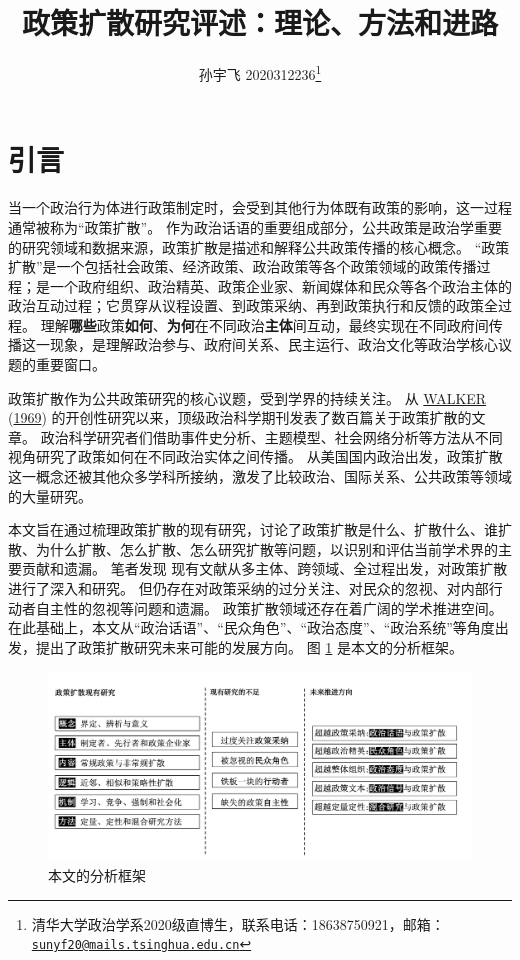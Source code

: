 \documentclass[
  12pt,
]{ctexart}
\title{政策扩散研究评述：理论、方法和进路}
\author{孙宇飞 2020312236\footnote{清华大学政治学系2020级直博生，联系电话：18638750921，邮箱：\href{mailto:sunyf20@mails.tsinghua.edu.cn}{\nolinkurl{sunyf20@mails.tsinghua.edu.cn}}}}
\date{}
\begin{document}
\maketitle

{
\hypersetup{linkcolor=}
\setcounter{tocdepth}{2}
\tableofcontents
}
\newpage

\hypertarget{ux5f15ux8a00}{%
\section{引言}\label{ux5f15ux8a00}}

当一个政治行为体进行政策制定时，会受到其他行为体既有政策的影响，这一过程通常被称为``政策扩散''。
作为政治话语的重要组成部分，公共政策是政治学重要的研究领域和数据来源，政策扩散是描述和解释公共政策传播的核心概念。
``政策扩散''是一个包括社会政策、经济政策、政治政策等各个政策领域的政策传播过程；是一个政府组织、政治精英、政策企业家、新闻媒体和民众等各个政治主体的政治互动过程；它贯穿从议程设置、到政策采纳、再到政策执行和反馈的政策全过程。
理解\textbf{哪些}政策\textbf{如何}、\textbf{为何}在不同政治\textbf{主体}间互动，最终实现在不同政府间传播这一现象，是理解政治参与、政府间关系、民主运行、政治文化等政治学核心议题的重要窗口。

政策扩散作为公共政策研究的核心议题，受到学界的持续关注。
从 \protect\hyperlink{ref-Walker1969}{WALKER} (\protect\hyperlink{ref-Walker1969}{1969}) 的开创性研究以来，顶级政治科学期刊发表了数百篇关于政策扩散的文章。
政治科学研究者们借助事件史分析、主题模型、社会网络分析等方法从不同视角研究了政策如何在不同政治实体之间传播。
从美国国内政治出发，政策扩散这一概念还被其他众多学科所接纳，激发了比较政治、国际关系、公共政策等领域的大量研究。

本文旨在通过梳理政策扩散的现有研究，讨论了政策扩散是什么、扩散什么、谁扩散、为什么扩散、怎么扩散、怎么研究扩散等问题，以识别和评估当前学术界的主要贡献和遗漏。
笔者发现
现有文献从多主体、跨领域、全过程出发，对政策扩散进行了深入和研究。
但仍存在对政策采纳的过分关注、对民众的忽视、对内部行动者自主性的忽视等问题和遗漏。
政策扩散领域还存在着广阔的学术推进空间。
在此基础上，本文从``政治话语''、``民众角色''、``政治态度''、``政治系统''等角度出发，提出了政策扩散研究未来可能的发展方向。
图 \ref{fig:frame} 是本文的分析框架。

\begin{figure}

{\centering \includegraphics[width=0.9\linewidth]{../figures/本文研究框架} 

}

\caption{本文的分析框架}\label{fig:frame}
\end{figure}
\end{document}
